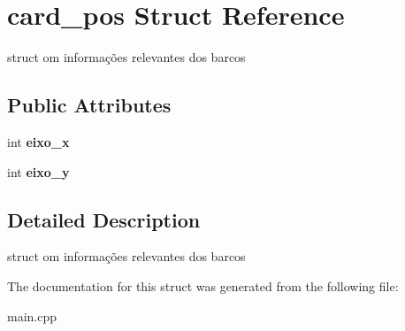 \hypertarget{structcard__pos}{}\section{card\+\_\+pos Struct Reference}
\label{structcard__pos}


struct om informações relevantes dos barcos  


\subsection*{Public Attributes}
\begin{DoxyCompactItemize}
\item 
\mbox{\label{structcard__pos_a0ee8701145c736eb4e776b631b4493d8}} 
int {\bfseries eixo\+\_\+x}
\item 
\mbox{\label{structcard__pos_a636621fc616211b8d9bf2a9d024afaed}} 
int {\bfseries eixo\+\_\+y}
\end{DoxyCompactItemize}


\subsection{Detailed Description}
struct om informações relevantes dos barcos 

The documentation for this struct was generated from the following file\+:\begin{DoxyCompactItemize}
\item 
main.\+cpp\end{DoxyCompactItemize}
